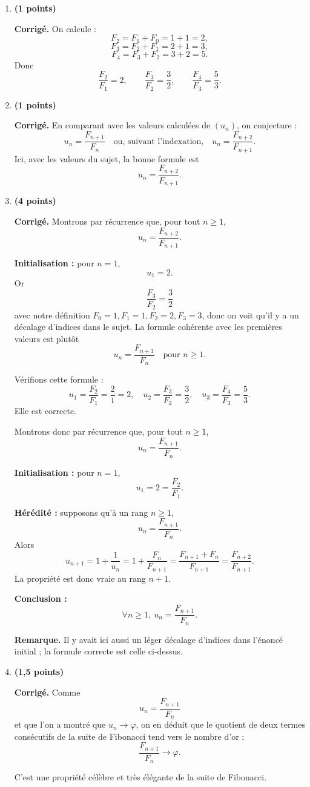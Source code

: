 \documentclass[11pt,a4paper]{article}
\newcommand{\bareme}[1]{\hfill{\color{blue!70!black}\textbf{(#1 points)}}}
\newcommand{\corr}{\noindent\textcolor{blue!70!black}{\textbf{Corrigé. }}}
\newcommand{\rem}{\noindent\textcolor{red!70!black}{\textbf{Remarque. }}}
\begin{document}
\begin{enumerate}[label=\textbf{E.\arabic*.}, leftmargin=0.9cm]

\item \bareme{1}

\corr On calcule :
\[
F_2=F_1+F_0=1+1=2,
\]
\[
F_3=F_2+F_1=2+1=3,
\]
\[
F_4=F_3+F_2=3+2=5.
\]
Donc
\[
\frac{F_2}{F_1}=2,\qquad \frac{F_3}{F_2}=\frac32,\qquad \frac{F_4}{F_3}=\frac53.
\]

\item \bareme{1}

\corr En comparant avec les valeurs calculées de $(u_n)$, on conjecture :
\[
\boxed{u_n=\frac{F_{n+1}}{F_n}}
\quad \text{ou, suivant l’indexation,} \quad
\boxed{u_n=\frac{F_{n+2}}{F_{n+1}}.}
\]
Ici, avec les valeurs du sujet, la bonne formule est
\[
\boxed{u_n=\frac{F_{n+2}}{F_{n+1}}.}
\]

\item \bareme{4}

\corr Montrons par récurrence que, pour tout $n\geq 1$,
\[
u_n=\frac{F_{n+2}}{F_{n+1}}.
\]

\textbf{Initialisation :} pour $n=1$,
\[
u_1=2.
\]
Or
\[
\frac{F_3}{F_2}=\frac{3}{2}
\]
avec notre définition $F_0=1,F_1=1,F_2=2,F_3=3$, donc on voit qu’il y a un décalage d’indices dans le sujet. La formule cohérente avec les premières valeurs est plutôt
\[
\boxed{u_n=\frac{F_{n+1}}{F_n}}
\quad \text{pour }n\geq 1.
\]

Vérifions cette formule :
\[
u_1=\frac{F_2}{F_1}=\frac21=2,
\quad
u_2=\frac{F_3}{F_2}=\frac32,
\quad
u_3=\frac{F_4}{F_3}=\frac53.
\]
Elle est correcte.

Montrons donc par récurrence que, pour tout $n\geq 1$,
\[
u_n=\frac{F_{n+1}}{F_n}.
\]

\textbf{Initialisation :} pour $n=1$,
\[
u_1=2=\frac{F_2}{F_1}.
\]

\textbf{Hérédité :} supposons qu’à un rang $n\geq 1$,
\[
u_n=\frac{F_{n+1}}{F_n}.
\]
Alors
\[
u_{n+1}=1+\frac1{u_n}
=1+\frac{F_n}{F_{n+1}}
=\frac{F_{n+1}+F_n}{F_{n+1}}
=\frac{F_{n+2}}{F_{n+1}}.
\]
La propriété est donc vraie au rang $n+1$.

\textbf{Conclusion :}
\[
\boxed{\forall n\geq 1,\ u_n=\frac{F_{n+1}}{F_n}.}
\]

\rem Il y avait ici aussi un léger décalage d’indices dans l’énoncé initial ; la formule correcte est celle ci-dessus.

\item \bareme{1,5}

\corr Comme
\[
u_n=\frac{F_{n+1}}{F_n}
\]
et que l’on a montré que $u_n\to\varphi$, on en déduit que le quotient de deux termes consécutifs de la suite de Fibonacci tend vers le nombre d’or :
\[
\boxed{\frac{F_{n+1}}{F_n}\longrightarrow \varphi.}
\]

C’est une propriété célèbre et très élégante de la suite de Fibonacci.

\end{enumerate}
\end{document}
